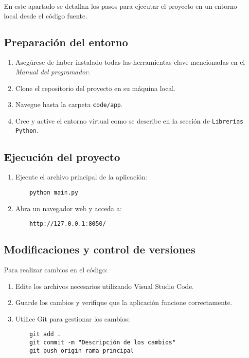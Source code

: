 En este apartado se detallan los pasos para ejecutar el proyecto en un entorno local desde el código fuente.

\subsection{Preparación del entorno}
\begin{enumerate}
    \item Asegúrese de haber instalado todas las herramientas clave mencionadas en el \textit{Manual del programador}.
    \item Clone el repositorio del proyecto en su máquina local.
    \item Navegue hasta la carpeta \texttt{code/app}.
    \item Cree y active el entorno virtual como se describe en la sección de \texttt{Librerías Python}.
\end{enumerate}

\subsection{Ejecución del proyecto}
\begin{enumerate}
    \item Ejecute el archivo principal de la aplicación:
    \begin{verbatim}
    python main.py
    \end{verbatim}
    \item Abra un navegador web y acceda a:
    \begin{verbatim}
    http://127.0.0.1:8050/
    \end{verbatim}
\end{enumerate}

\subsection{Modificaciones y control de versiones}
Para realizar cambios en el código:
\begin{enumerate}
    \item Edite los archivos necesarios utilizando Visual Studio Code.
    \item Guarde los cambios y verifique que la aplicación funcione correctamente.
    \item Utilice Git para gestionar los cambios:
    \begin{verbatim}
    git add .
    git commit -m "Descripción de los cambios"
    git push origin rama-principal
    \end{verbatim}
\end{enumerate}

